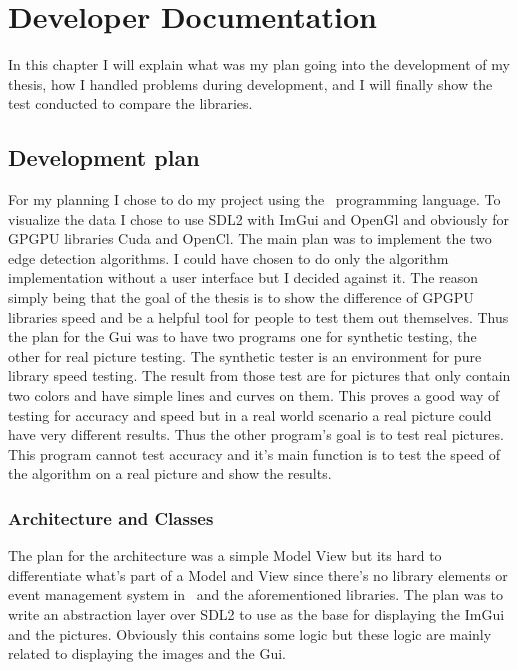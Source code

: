 \chapter{Developer Documentation}

In this chapter I will explain what was my plan going into the development of my thesis, how I handled problems during development, and I will finally show the test conducted to compare the libraries.

\section{Development plan}
\label{chap:plan}

For my planning I chose to do my project using the \CC\ programming language. To visualize the data I chose to use \ac{SDL2} with \ac{ImGui} and OpenGl and obviously for \ac{GPGPU} libraries Cuda and OpenCl. The main plan was to implement the two edge detection algorithms. I could have chosen to do only the algorithm implementation without a user interface but I decided against it. The reason simply being that the goal of the thesis is to show the difference of \ac{GPGPU} libraries speed and be a helpful tool for people to test them out themselves. Thus the plan for the Gui was to have two programs one for synthetic testing, the other for real picture testing. The synthetic tester is an environment for pure library speed testing. The result from those test are for pictures that only contain two colors and have simple lines and curves on them. This proves a good way of testing for accuracy and speed but in a real world scenario a real picture could have very different results. Thus the other program's goal is to test real pictures. This program cannot test accuracy and it's main function is to test the speed of the algorithm on a real picture and show the results.


\subsection{Architecture and Classes}
\label{chap:dev}
The plan for the architecture was a simple Model View but its hard to differentiate what's part of a Model and View since there's no library elements or event management system in \CC\ and the aforementioned libraries. The plan was to write an abstraction layer over \ac{SDL2} to use as the base for displaying the \ac{ImGui} and the pictures. Obviously this contains some logic but these logic are mainly related to displaying the images and the Gui.

